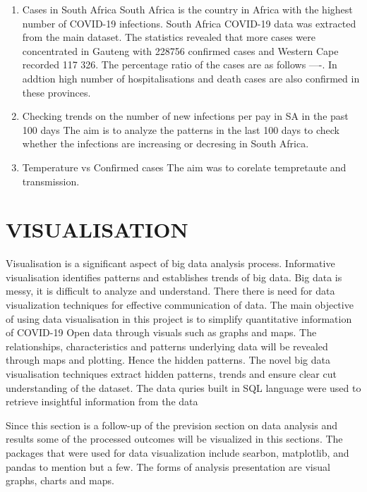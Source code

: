 \documentclass[11pt]{article}
\begin{document}
\begin{enumerate}
    \item Cases in South Africa
    South Africa is the country in Africa with the highest number of  COVID-19 infections. South Africa COVID-19 data was extracted from the main dataset. The statistics revealed that more cases were concentrated in Gauteng with 228756 confirmed cases and Western Cape recorded 117 326.  The percentage ratio of the cases are as follows ----. In addtion high  number of hospitalisations and death cases are also confirmed in these provinces. 
    
    
    \item Checking trends on the number of new infections per pay in SA in the past 100 days
    The aim is to analyze the patterns in the last 100 days  to check whether the infections are increasing or decresing in South Africa.
     
     \item Temperature vs Confirmed cases
     The aim was to corelate tempretaute and transmission. 
    
\end{enumerate}

\section{VISUALISATION}
Visualisation is a significant aspect of big data analysis process. Informative visualisation identifies patterns and establishes trends of big data. Big data is messy, it is difficult to analyze and understand. There there is need for data visualization techniques for effective communication of data. The main objective of using data visualisation in this project is to simplify quantitative information of COVID-19 Open data through visuals such as graphs and maps. The relationships, characteristics and patterns underlying data will be revealed through maps and plotting. Hence the  hidden patterns. The novel big data visualisation techniques extract hidden patterns, trends and ensure clear cut understanding of the dataset. The data quries built in SQL language were used to retrieve insightful information from the data

Since this section is a follow-up of the prevision section on data analysis and results some of the processed outcomes will be visualized in this sections. The packages that were used for data visualization include searbon, matplotlib, and pandas to mention but a few. The forms of analysis presentation are visual graphs, charts and maps.
\end{document}
